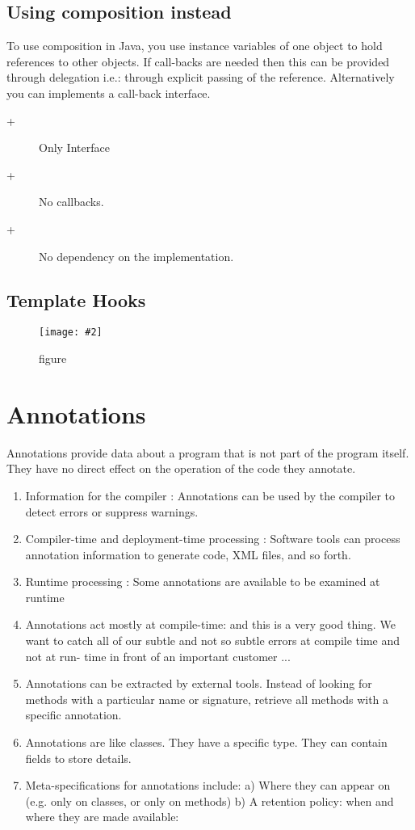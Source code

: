 \documentclass[a4paper,10pt]{scrreprt}
\newcommand{\pic}[2][figure]{\begin{figure}[h]
 \centering
 \texttt{[image: \#2]}
 \caption{#1}
\end{figure}
}
\begin{document}
\subsection{Using composition instead}
\begin{framed}
 To use composition in Java, you use instance variables of one object to
hold references to other objects. If call-backs are needed then this can be provided through
delegation i.e.: through explicit passing of the
reference. Alternatively you can implements a call-back
interface.
\begin{description}
 \item [+] Only Interface
 \item [+] No callbacks. 
 \item [+] No dependency on the implementation.
\end{description}

\end{framed}

 \subsection{Template Hooks}
 \pic{thooks.png}

\section{Annotations}
Annotations provide data about a program that is not part of the program
itself. They have no direct effect on the operation of the code they
annotate.

\begin{enumerate}
 \item Information for the compiler : Annotations can be used by the
compiler to detect errors or suppress warnings.
\item  Compiler-time and deployment-time processing : Software
tools can process annotation information to generate code, XML
files, and so forth.
\item Runtime processing : Some annotations are available to be
examined at runtime
\item Annotations act mostly at compile-time: and this is a very good thing. We want
to catch all of our subtle and not so subtle errors at compile time and not at run-
time in front of an important customer ...
\item Annotations can be extracted by external tools. Instead of looking for methods
with a particular name or signature, retrieve all methods with a specific
annotation.
\item Annotations are like classes. They have a specific type. They can contain fields
to store details.
\item Meta-specifications for annotations include:
a) Where they can appear on (e.g. only on classes, or only on methods)
b) A retention policy: when and where they are made available:
\end{enumerate}
\end{document}
